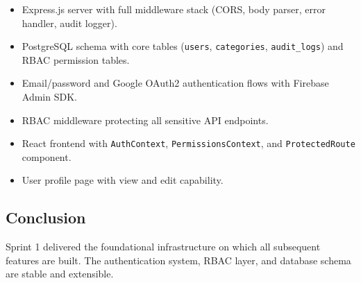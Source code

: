 \begin{itemize}
  \item Express.js server with full middleware stack (CORS, body parser, error handler, audit logger).
  \item PostgreSQL schema with core tables (\texttt{users}, \texttt{categories}, \texttt{audit\_logs}) and RBAC permission tables.
  \item Email/password and Google OAuth2 authentication flows with Firebase Admin SDK.
  \item RBAC middleware protecting all sensitive API endpoints.
  \item React frontend with \texttt{AuthContext}, \texttt{PermissionsContext}, and \texttt{ProtectedRoute} component.
  \item User profile page with view and edit capability.
\end{itemize}

\subsection*{Conclusion}
Sprint 1 delivered the foundational infrastructure on which all subsequent features are built. The authentication system, RBAC layer, and database schema are stable and extensible.
